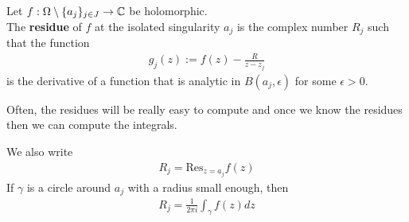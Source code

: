 \begin{definition}[]
	Let $f: \Omega \setminus \{a_j\}_{j \in J} \to \mathbb{C}$ be holomorphic.\\
	The \textbf{residue} of $f$ at the isolated singularity $a_j$ is the complex number $R_j$ such that the function
	\begin{align*}
		g_j(z) := f(z) - \frac{R}{z - z_j}
	\end{align*} 
	is the derivative of a function that is analytic in $B(a_j,\epsilon)$ for some $\epsilon > 0$.
\end{definition}
Often, the residues will be really easy to compute and once we know the residues then we can compute the integrals.

We also write
\begin{align*}
	R_j = \text{Res}_{z = a_j}f(z)
\end{align*}
If $\gamma$ is a circle around $a_j$ with a radius small enough, then
\begin{align*}
	R_j = \frac{1}{2\pi i} \int_{\gamma}f(z) dz
\end{align*}




